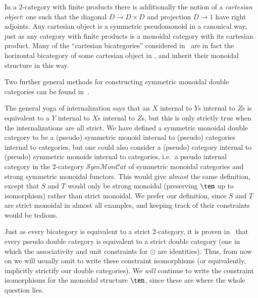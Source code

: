 \documentclass{amsart}
\begin{document}
\begin{rmk}
  In a 2-category with finite products there is additionally the
  notion of a \emph{cartesian object}: one such that the diagonal
  $D\to D\times D$ and projection $D\to 1$ have right adjoints.  Any
  cartesian object is a symmetric pseudomonoid in a canonical way,
  just as any category with finite products is a monoidal category
  with its cartesian product.  Many of the ``cartesian bicategories''
  considered in~\cite{cw:cart-bicats-i,ckww:cartbicats-ii} are in
  fact the horizontal bicategory of some cartesian object in \cDbl,
  and inherit their monoidal structure in this way.
\end{rmk}

Two further general methods for constructing symmetric monoidal double
categories can be found in~\cite{shulman:frbi}.

\begin{rmk}
  The general yoga of internalization says that an $X$ internal to
  $Y$s internal to $Z$s is equivalent to a $Y$ internal to $X$s
  internal to $Z$s, but this is only strictly true when the
  internalizations are all strict.  We have defined a symmetric
  monoidal double category to be a (pseudo) symmetric monoid internal
  to (pseudo) categories internal to categories, but one could also
  consider a (pseudo) category internal to (pseudo) symmetric monoids
  internal to categories, i.e.\ a pseudo internal category in the
  2-category
  $\mathcal{S}\mathit{ym}\mathcal{M}\mathit{on}\mathcal{C}\mathit{at}$
  of symmetric monoidal categories and strong symmetric monoidal
  functors.  This would give \emph{almost} the same definition, except
  that $S$ and $T$ would only be strong monoidal (preserving $\ten$ up
  to isomorphism) rather than strict monoidal.  We prefer our
  definition, since $S$ and $T$ are strict monoidal in almost all
  examples, and keeping track of their constraints would be tedious.
\end{rmk}

Just as every bicategory is equivalent to a strict 2-category, it is
proven in~\cite{gp:double-limits} that every pseudo double category is
equivalent to a strict double category (one in which the associativity
and unit constraints for $\odot$ are identities).  Thus, from now on
we will usually omit to write these constraint isomorphisms (or
equivalently, implicitly strictify our double categories).  We
\emph{will} continue to write the constraint isomorphisms for the
monoidal structure $\ten$, since these are where the whole question
lies.
\end{document}
